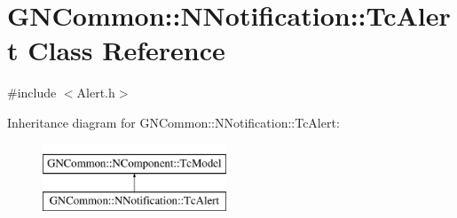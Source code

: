 \hypertarget{class_g_n_common_1_1_n_notification_1_1_tc_alert}{}\section{G\+N\+Common\+:\+:N\+Notification\+:\+:Tc\+Alert Class Reference}
\label{class_g_n_common_1_1_n_notification_1_1_tc_alert}


{\ttfamily \#include $<$Alert.\+h$>$}

Inheritance diagram for G\+N\+Common\+:\+:N\+Notification\+:\+:Tc\+Alert\+:\begin{figure}[H]
\begin{center}
\leavevmode
\includegraphics[height=2.000000cm]{class_g_n_common_1_1_n_notification_1_1_tc_alert}
\end{center}
\end{figure}

